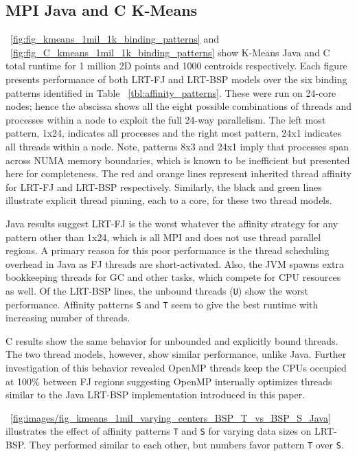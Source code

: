 \documentclass[10pt, conference, compsocconf]{IEEEtran}
\begin{document}
\subsection{MPI Java and C K-Means}
\figurename~\ref{fig:fig_kmeans_1mil_1k_binding_patterns} and \figurename~\ref{fig:fig_C_kmeans_1mil_1k_binding_patterns} show K-Means Java and C total runtime for 1 million 2D points and 1000 centroids respectively. Each figure presents performance of both \ac{LRT-FJ} and \ac{LRT-BSP} models over the six binding patterns identified in Table ~\ref{tbl:affinity_patterns}. These were run on 24-core nodes; hence the abscissa shows all the eight possible combinations of threads and processes within a node to exploit the full 24-way parallelism. The left most pattern, 1x24, indicates all processes and the right most pattern, 24x1 indicates all threads within a node. Note, patterns 8x3 and 24x1 imply that processes span across \ac{NUMA} memory boundaries, which is known to be inefficient but presented here for completeness. The red and orange lines represent inherited thread affinity for \ac{LRT-FJ} and \ac{LRT-BSP} respectively. Similarly, the black and green lines illustrate explicit thread pinning, each to a core, for these two thread models. 

Java results suggest \ac{LRT-FJ} is the worst whatever the affinity strategy for any pattern other than 1x24, which is all \ac{MPI} and does not use thread parallel regions. A primary reason for this poor performance is the thread scheduling overhead in Java as \ac{FJ} threads are short-activated. Also, the \ac{JVM} spawns extra bookkeeping threads for \ac{GC} and other tasks, which compete for \acs{CPU} resources as well. Of the \ac{LRT-BSP} lines, the unbound threads (\texttt{U}) show the worst performance. Affinity patterns \texttt{S} and \texttt{T} seem to give the best runtime with increasing number of threads. 

C results show the same behavior for unbounded and explicitly bound threads. The two thread models, however, show similar performance, unlike Java. Further investigation of this behavior revealed OpenMP threads keep the \acsp{CPU} occupied at 100\% between \ac{FJ} regions suggesting OpenMP internally optimizes threads similar to the Java \ac{LRT-BSP} implementation introduced in this paper.

\figurename~\ref{fig:images/fig_kmeans_1mil_varying_centers_BSP_T_vs_BSP_S_Java} illustrates the effect of affinity patterns \texttt{T} and \texttt{S} for varying data sizes on \ac{LRT-BSP}. They performed similar to each other, but numbers favor pattern \texttt{T} over \texttt{S}.
\end{document}

